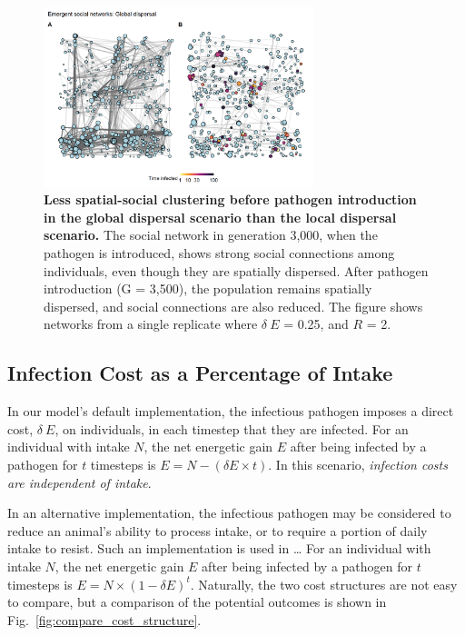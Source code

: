 \begin{figure}
    \centering
    \includegraphics[width=0.7\textwidth]{figures/pathomove/fig_networks_global.png}
    \caption{
        \textbf{Less spatial-social clustering before pathogen introduction in the global dispersal scenario than the local dispersal scenario.} 
        The social network in generation 3,000, when the pathogen is introduced, shows strong social connections among individuals, even though they are spatially dispersed. 
        After pathogen introduction (G = 3,500), the population remains spatially dispersed, and social connections are also reduced. 
        The figure shows networks from a single replicate where $\delta~E$ = 0.25, and $R$ = 2.
    }\label{fig:patho_network_global}
\end{figure}

\subsection*{Infection Cost as a Percentage of Intake}

In our model's default implementation, the infectious pathogen imposes a direct cost, $\delta~E$, on individuals, in each timestep that they are infected.
For an individual with intake $N$, the net energetic gain $E$ after being infected by a pathogen for $t$ timesteps is $E = N - (\delta E \times t)$.
In this scenario, \emph{infection costs are independent of intake}.

In an alternative implementation, the infectious pathogen may be considered to reduce an animal's ability to process intake, or to require a portion of daily intake to resist.
Such an implementation is used in \ldots{}
For an individual with intake $N$, the net energetic gain $E$ after being infected by a pathogen for $t$ timesteps is $E = N \times (1 - \delta E) ^ t$.
Naturally, the two cost structures are not easy to compare, but a comparison of the potential outcomes is shown in Fig.~\ref{fig:compare_cost_structure}.

